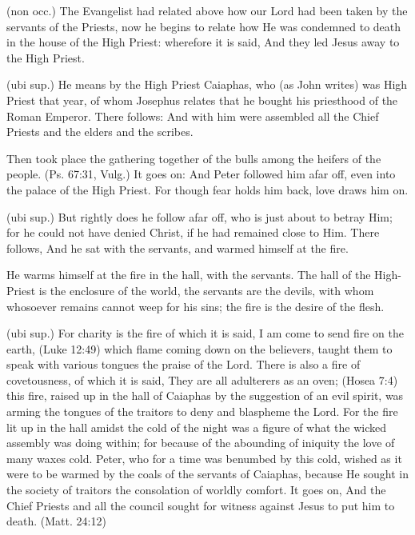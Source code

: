  

 (non occ.) The Evangelist had related above how our Lord had been taken by the servants of the Priests, now he begins to relate how He was condemned to death in the house of the High Priest: wherefore it is said, And they led Jesus away to the High Priest.

 (ubi sup.) He means by the High Priest Caiaphas, who (as John writes) was High Priest that year, of whom Josephus relates that he bought his priesthood of the Roman Emperor. There follows: And with him were assembled all the Chief Priests and the elders and the scribes.

 Then took place the gathering together of the bulls among the heifers of the people. (Ps. 67:31, Vulg.) It goes on: And Peter followed him afar off, even into the palace of the High Priest. For though fear holds him back, love draws him on.

 (ubi sup.) But rightly does he follow afar off, who is just about to betray Him; for he could not have denied Christ, if he had remained close to Him. There follows, And he sat with the servants, and warmed himself at the fire.

 He warms himself at the fire in the hall, with the servants. The hall of the High-Priest is the enclosure of the world, the servants are the devils, with whom whosoever remains cannot weep for his sins; the fire is the desire of the flesh.

 (ubi sup.) For charity is the fire of which it is said, I am come to send fire on the earth, (Luke 12:49) which flame coming down on the believers, taught them to speak with various tongues the praise of the Lord. There is also a fire of covetousness, of which it is said, They are all adulterers as an oven; (Hosea 7:4) this fire, raised up in the hall of Caiaphas by the suggestion of an evil spirit, was arming the tongues of the traitors to deny and blaspheme the Lord. For the fire lit up in the hall amidst the cold of the night was a figure of what the wicked assembly was doing within; for because of the abounding of iniquity the love of many waxes cold. Peter, who for a time was benumbed by this cold, wished as it were to be warmed by the coals of the servants of Caiaphas, because He sought in the society of traitors the consolation of worldly comfort. It goes on, And the Chief Priests and all the council sought for witness against Jesus to put him to death. (Matt. 24:12)

